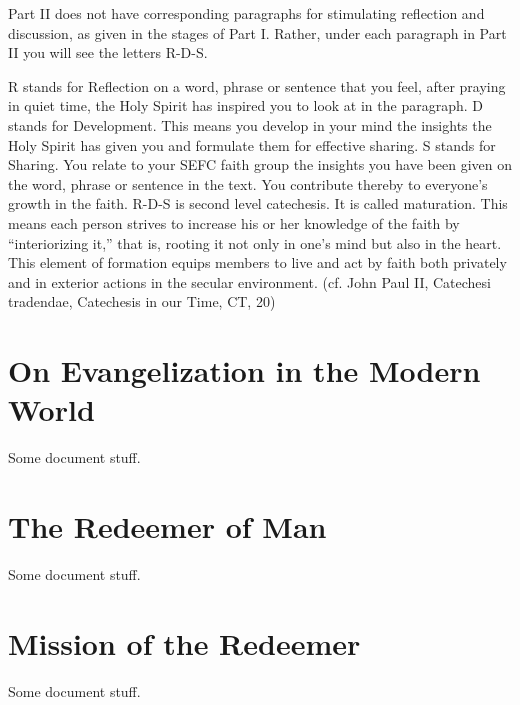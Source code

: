 \documentclass[oneside]{book}
\begin{document}
Part II does not have corresponding paragraphs for stimulating reflection and
discussion, as given in the stages of Part I. Rather, under each paragraph in
Part II you will see the letters R-D-S.

R stands for Reflection on a word, phrase or sentence that you feel, after
praying in quiet time, the Holy Spirit has inspired you to look at in the
paragraph. D stands for Development. This means you develop in your mind the
insights the Holy Spirit has given you and formulate them for effective
sharing. S stands for Sharing. You relate to your SEFC faith group the insights
you have been given on the word, phrase or sentence in the text. You contribute
thereby to everyone's growth in the faith. R-D-S is second level catechesis. It
is called maturation. This means each person strives to increase his or her
knowledge of the faith by ``interiorizing it,'' that is, rooting it not only in
one's mind but also in the heart. This element of formation equips members to
live and act by faith both privately and in exterior actions in the secular
environment. (cf. John Paul II, Catechesi tradendae, Catechesis in our Time, CT,
20)


\chapter{On Evangelization in the Modern World}

Some document stuff.


\chapter{The Redeemer of Man}

Some document stuff.


\chapter{Mission of the Redeemer}

Some document stuff.

\end{document}
